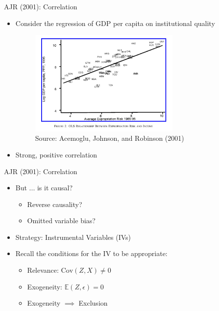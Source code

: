 \documentclass[11pt,notes=hide,aspectratio=169,mathserif]{beamer}
\begin{document}
\begin{frame}{AJR (2001): Correlation}
\begin{itemize}
\item Consider the regression of GDP per capita on institutional quality
\begin{figure}
\centering
\includegraphics[width=0.7\textwidth]{inputs/AJR1.png}
\caption{Source: Acemoglu, Johnson, and Robinson (2001)}
\end{figure}
\item Strong, positive correlation
\end{itemize}
\end{frame}

\begin{frame}{AJR (2001): Correlation}
\begin{itemize}
\item But ... is it causal? 
\begin{itemize}
    \pause \item Reverse causality?
    \pause \item Omitted variable bias?
\end{itemize}
\pause \item Strategy: Instrumental Variables (IVs)
\item Recall the conditions for the IV to be appropriate:
\begin{itemize}
    \item Relevance: $\textrm{Cov}(Z, X) \neq 0$
    \item Exogeneity: $\mathbb{E}(Z, \epsilon) = 0$
    \item Exogeneity $\implies$ Exclusion
\end{itemize}
\end{itemize}
\end{frame}
\end{document}
